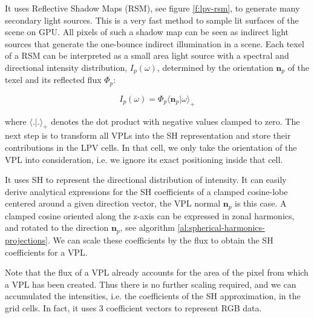 It uses Reflective Shadow Maps (RSM), see figure \ref{f:lpv-rsm}, to generate many secondary light sources. This is a very fast method to sample lit surfaces of the scene on GPU. All pixels of such a shadow map can be seen as indirect light sources that generate the one-bounce indirect illumination in a scene. Each texel of a RSM can be interpreted as a small area light source with a spectral and directional intensity distribution, $I_p(\omega)$, determined by the orientation $\mathbf{n}_p$ of the texel and its reflected flux $\Phi_p$:

\begin{equation*}
	I_p(\omega)=\Phi_p\langle\mathbf{n}_p|\omega\rangle_+
\end{equation*}

where $\langle .|. \rangle_+$ denotes the dot product with negative values clamped to zero. The next step is to transform all VPLs into the SH representation and store their contributions in the LPV cells. In that cell, we only take the orientation of the VPL into consideration, i.e. we ignore its exact positioning inside that cell.

It uses SH to represent the directional distribution of intensity. It can easily derive analytical expressions for the SH coefficients of a clamped cosine-lobe centered around a given direction vector, the VPL normal $\mathbf{n}_p$ is this case. A clamped cosine oriented along the z-axis can be expressed in zonal harmonics\cite{a:Ontherelationshipbetweenradianceandirradiance:determiningtheillumina-tionfromimagesofaconvexlambertianobject.}, and rotated to the direction $\mathbf{n}_p$, see algorithm \ref{al:spherical-harmonics-projections}. We can scale these coefficients by the flux to obtain the SH coefficients for a VPL.

Note that the flux of a VPL already accounts for the area of the pixel from which a VPL has been created. Thus there is no further scaling required, and we can accumulated the intensities, i.e. the coefficients of the SH approximation, in the grid cells. In fact, it uses 3 coefficient vectors to represent RGB data.

